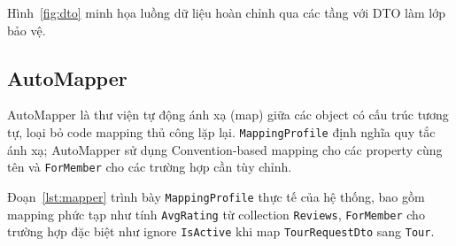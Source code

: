 Hình~\ref{fig:dto} minh họa luồng dữ liệu hoàn chỉnh qua
các tầng với DTO làm lớp bảo vệ.

\subsection{AutoMapper}\label{sub3.5.2}

AutoMapper là thư viện tự động ánh xạ (map) giữa các object
có cấu trúc tương tự, loại bỏ code mapping thủ công lặp lại.
\texttt{MappingProfile} định nghĩa quy tắc ánh xạ; AutoMapper
sử dụng Convention-based mapping cho các property cùng tên và
\texttt{ForMember} cho các trường hợp cần tùy chỉnh.

Đoạn~\ref{lst:mapper} trình bày \texttt{MappingProfile} thực
tế của hệ thống, bao gồm mapping phức tạp như tính
\texttt{AvgRating} từ collection \texttt{Reviews},
\texttt{ForMember} cho trường hợp đặc biệt như ignore
\texttt{IsActive} khi map \texttt{TourRequestDto} sang
\texttt{Tour}.

